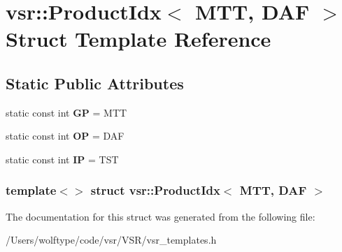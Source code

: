 \hypertarget{structvsr_1_1_product_idx_3_01_m_t_t_00_01_d_a_f_01_4}{\section{vsr\-:\-:Product\-Idx$<$ M\-T\-T, D\-A\-F $>$ Struct Template Reference}
\label{structvsr_1_1_product_idx_3_01_m_t_t_00_01_d_a_f_01_4}
}
\subsection*{Static Public Attributes}
\begin{DoxyCompactItemize}
\item 
\hypertarget{structvsr_1_1_product_idx_3_01_m_t_t_00_01_d_a_f_01_4_a680f9d17ffa75ff405b76d184b9fe9f5}{static const int {\bfseries G\-P} = M\-T\-T}\label{structvsr_1_1_product_idx_3_01_m_t_t_00_01_d_a_f_01_4_a680f9d17ffa75ff405b76d184b9fe9f5}

\item 
\hypertarget{structvsr_1_1_product_idx_3_01_m_t_t_00_01_d_a_f_01_4_a46c8a71826fe19b3f3e3723985b72a15}{static const int {\bfseries O\-P} = D\-A\-F}\label{structvsr_1_1_product_idx_3_01_m_t_t_00_01_d_a_f_01_4_a46c8a71826fe19b3f3e3723985b72a15}

\item 
\hypertarget{structvsr_1_1_product_idx_3_01_m_t_t_00_01_d_a_f_01_4_a9ce24461a02b94d94d380c13c39b3bb6}{static const int {\bfseries I\-P} = T\-S\-T}\label{structvsr_1_1_product_idx_3_01_m_t_t_00_01_d_a_f_01_4_a9ce24461a02b94d94d380c13c39b3bb6}

\end{DoxyCompactItemize}
\subsubsection*{template$<$$>$ struct vsr\-::\-Product\-Idx$<$ M\-T\-T, D\-A\-F $>$}



The documentation for this struct was generated from the following file\-:\begin{DoxyCompactItemize}
\item 
/\-Users/wolftype/code/vsr/\-V\-S\-R/vsr\-\_\-templates.\-h\end{DoxyCompactItemize}
